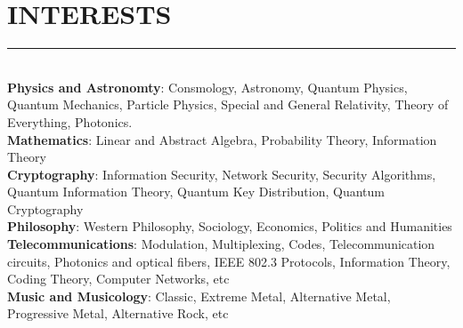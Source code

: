 \documentclass[10pt,a4paper]{article}
\begin{document}
\section{INTERESTS}
\noindent \rule {2.9cm}{0.4pt} \\
\textbullet \hspace{0.1cm} \textbf{Physics and Astronomty}: Consmology, Astronomy, Quantum Physics, Quantum Mechanics, Particle Physics, Special and General Relativity, Theory of Everything, Photonics. \\
\textbullet \hspace{0.1cm} \textbf{Mathematics}: Linear and Abstract Algebra, Probability Theory, Information Theory \\
\textbullet \hspace{0.1cm} \textbf{Cryptography}: Information Security, Network Security, Security Algorithms, Quantum Information Theory, Quantum Key Distribution, Quantum Cryptography \\
\textbullet \hspace{0.1cm} \textbf{Philosophy}: Western Philosophy, Sociology, Economics, Politics and Humanities \\
\textbullet \hspace{0.1cm} \textbf{Telecommunications}: Modulation, Multiplexing, Codes, Telecommunication circuits, Photonics and optical fibers, IEEE 802.3 Protocols, Information Theory, Coding Theory, Computer Networks, etc \\
\textbullet \hspace{0.1cm} \textbf{Music and Musicology}: Classic, Extreme Metal, Alternative Metal, Progressive Metal, Alternative Rock, etc
\end{document}
